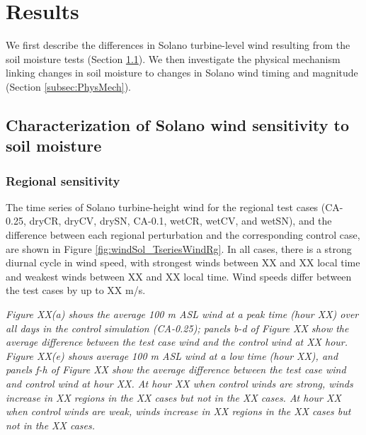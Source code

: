 
%
%
%
%
%

\section{Results}

We first describe the differences in Solano turbine-level wind resulting from the soil moisture tests (Section \ref{subsec:CharWindChanges}).  We then investigate the physical mechanism linking changes in soil moisture to changes in Solano wind timing and magnitude (Section \ref{subsec:PhysMech}).

\subsection{Characterization of Solano wind sensitivity to soil moisture}
\label{subsec:CharWindChanges}

\subsubsection{Regional sensitivity}

The time series of Solano turbine-height wind for the regional test cases (CA-0.25, dryCR, dryCV, drySN, CA-0.1, wetCR, wetCV, and wetSN), and the difference between each regional perturbation and the corresponding control case, are shown in Figure \ref{fig:windSol_TseriesWindRg}.  In all cases, there is a strong diurnal cycle in wind speed, with strongest winds between XX and XX local time and weakest winds between XX and XX local time.  Wind speeds differ between the test cases by up to XX m/s.  

\textit{Figure XX(a) shows the average 100 m ASL wind at a peak time (hour XX) over all days in the control simulation (CA-0.25); panels b-d of Figure XX show the average difference between the test case wind and the control wind at XX hour.  Figure XX(e) shows average 100 m ASL wind at a low time (hour XX), and panels f-h of Figure XX show the average difference between the test case wind and control wind at hour XX.  At hour XX when control winds are strong, winds increase in XX regions in the XX cases but not in the XX cases.  At hour XX when control winds are weak, winds increase in XX regions in the XX cases but not in the XX cases.}

